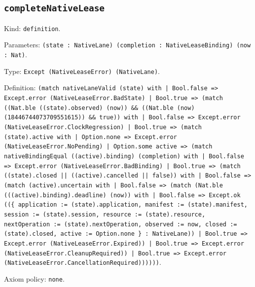 \documentclass[11pt]{article}
\begin{document}
\subsection*{\texttt{completeNativeLease}}
\noindent Kind: \texttt{definition}.\par
\noindent Parameters: \texttt{(state : NativeLane) (completion : NativeLeaseBinding) (now : Nat)}.\par
\noindent Type: \texttt{Except (NativeLeaseError) (NativeLane)}.\par
\noindent Definition: \texttt{(match nativeLaneValid (state) with | Bool.false => Except.error (NativeLeaseError.BadState) | Bool.true => (match ((Nat.ble ((state).observed) (now)) \&\& ((Nat.ble (now) (18446744073709551615)) \&\& true)) with | Bool.false => Except.error (NativeLeaseError.ClockRegression) | Bool.true => (match (state).active with | Option.none => Except.error (NativeLeaseError.NoPending) | Option.some active => (match nativeBindingEqual ((active).binding) (completion) with | Bool.false => Except.error (NativeLeaseError.BadBinding) | Bool.true => (match ((state).closed || ((active).cancelled || false)) with | Bool.false => (match (active).uncertain with | Bool.false => (match (Nat.ble (((active).binding).deadline) (now)) with | Bool.false => Except.ok ((\{ application := (state).application, manifest := (state).manifest, session := (state).session, resource := (state).resource, nextOperation := (state).nextOperation, observed := now, closed := (state).closed, active := Option.none \} : NativeLane)) | Bool.true => Except.error (NativeLeaseError.Expired)) | Bool.true => Except.error (NativeLeaseError.CleanupRequired)) | Bool.true => Except.error (NativeLeaseError.CancellationRequired))))))}.\par
\noindent Axiom policy: \texttt{none}.\par
\end{document}
